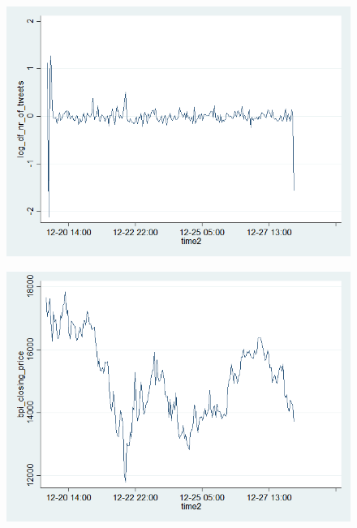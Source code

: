 \documentclass[a4paper,american,12pt]{article}
\begin{document}
\begin{spacing}{1.2}
	\begin{figure}[H]
	\graphicspath{ {stata_export_graphs/} }
	\includegraphics[scale=0.45]{graph_plot_log_df_nr_tweets.png}
	\end{figure}
	
	\begin{figure}[H]
	\graphicspath{ {stata_export_graphs/} }
	\includegraphics[scale=0.45]{graph_plot_bpi.png}
	\end{figure}


\end{spacing}
\end{document}
